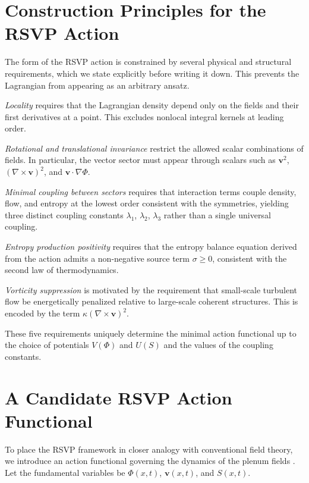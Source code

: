\documentclass[12pt,a4paper]{article}
\theoremstyle{plain}
\theoremstyle{definition}
\theoremstyle{remark}
\begin{document}
\section{Construction Principles for the RSVP Action}
\label{sec:principles}

The form of the RSVP action is constrained by several physical and
structural requirements, which we state explicitly before writing it
down. This prevents the Lagrangian from appearing as an arbitrary
ansatz.

\emph{Locality} requires that the Lagrangian density depend only on
the fields and their first derivatives at a point. This excludes
nonlocal integral kernels at leading order.

\emph{Rotational and translational invariance} restrict the allowed
scalar combinations of fields. In particular, the vector sector must
appear through scalars such as $\mathbf{v}^2$, $(\nabla \times
\mathbf{v})^2$, and $\mathbf{v} \cdot \nabla \Phi$.

\emph{Minimal coupling between sectors} requires that interaction
terms couple density, flow, and entropy at the lowest order consistent
with the symmetries, yielding three distinct coupling constants
$\lambda_1$, $\lambda_2$, $\lambda_3$ rather than a single universal
coupling.

\emph{Entropy production positivity} requires that the entropy balance
equation derived from the action admits a non-negative source term
$\sigma \geq 0$, consistent with the second law of thermodynamics.

\emph{Vorticity suppression} is motivated by the requirement that
small-scale turbulent flow be energetically penalized relative to
large-scale coherent structures. This is encoded by the term
$\kappa(\nabla \times \mathbf{v})^2$.

These five requirements uniquely determine the minimal action
functional up to the choice of potentials $V(\Phi)$ and $U(S)$ and the
values of the coupling constants.

\section{A Candidate RSVP Action Functional}
\label{sec:action}

To place the RSVP framework in closer analogy with conventional field
theory, we introduce an action functional governing the dynamics of the
plenum fields \cite{LandauFluid,MisnerThorneWheeler}. Let the
fundamental variables be $\Phi(x,t)$, $\mathbf{v}(x,t)$, and $S(x,t)$.
\end{document}
